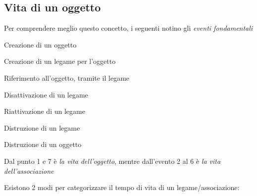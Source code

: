 \subsection{Vita di un oggetto}

Per comprendere meglio questo concetto, i seguenti notino gli \textit{eventi fondamentali} 
\begin{redblacklist}
  \item Creazione di un oggetto  
  \item Creazione di un legame per l’oggetto  
  \item Riferimento all’oggetto, tramite il legame  
  \item Disattivazione di un legame  
  \item Riattivazione di un legame  
  \item Distruzione di un legame  
  \item Distruzione di un oggetto  
\end{redblacklist}

Dal punto 1 e 7 è \textit{la vita dell'oggetto}, mentre dall'evento 2 al 6 è \textit{la vita dell'associazione}


Esistono 2 modi per categorizzare il tempo di vita di un legame/associazione:

